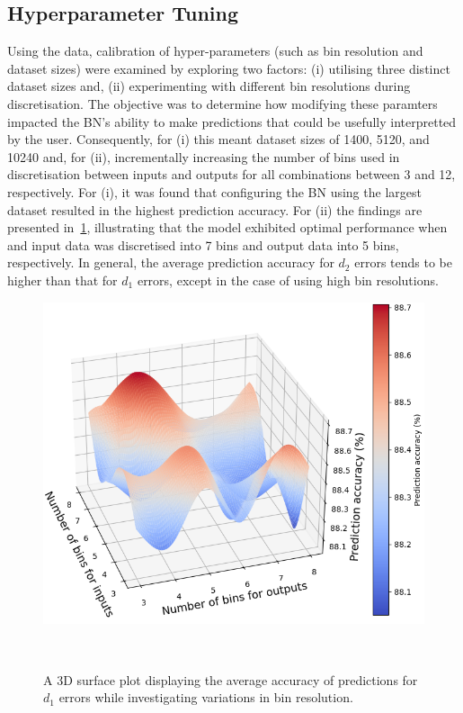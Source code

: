 \documentclass[journal]{IEEEtran}
\begin{document}
\subsection{Hyperparameter Tuning}\label{sec:res_hyperparameter}
Using the data, calibration of hyper-parameters (such as bin resolution and dataset sizes) were examined by exploring two factors: (i) utilising three distinct dataset sizes and, (ii) experimenting with different bin resolutions during discretisation. The objective was to determine how modifying these paramters impacted the BN's ability to make predictions that could be usefully interpretted by the user. Consequently, for (i) this meant dataset sizes of 1400, 5120, and 10240 and, for (ii), incrementally increasing the number of bins used in discretisation between inputs and outputs for all combinations between 3 and 12, respectively. For (i), it was found that configuring the BN using the largest dataset resulted in the highest prediction accuracy. For (ii) the findings are presented in~\ref{fig:3D_SA_trimmed_39_D1}, illustrating that the model exhibited optimal performance when and input data was discretised into 7 bins and output data into 5 bins, respectively. In general, the average prediction accuracy for $d_{2}$ errors tends to be higher than that for $d_{1}$ errors, except in the case of using high bin resolutions.

\begin{figure}[h]
    \centering
    \includegraphics[width=\columnwidth]{figures/SA_3D_trimmed_39.png}
    \caption{\small A 3D surface plot displaying the average accuracy of predictions for $d_{1}$ errors while investigating variations in bin resolution.}~\label{fig:3D_SA_trimmed_39_D1}
\end{figure}
\end{document}
